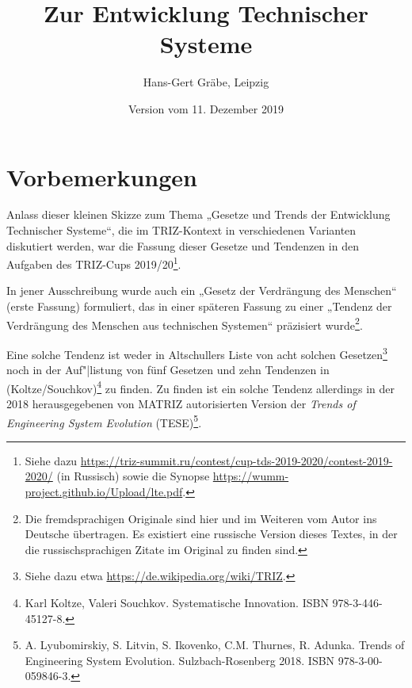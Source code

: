 \documentclass[11pt,a4paper]{article}
\title{Zur Entwicklung Technischer Systeme}
\author{Hans-Gert Gräbe, Leipzig}
\date{Version vom 11. Dezember 2019}
\begin{document}
\maketitle

\section{Vorbemerkungen}

Anlass dieser kleinen Skizze zum Thema „Gesetze und Trends der Entwicklung
Technischer Systeme“, die im TRIZ-Kontext in verschiedenen Varianten
diskutiert werden, war die Fassung dieser Gesetze und Tendenzen in den
Aufgaben des TRIZ-Cups 2019/20\footnote{Siehe dazu
  \url{https://triz-summit.ru/contest/cup-tds-2019-2020/contest-2019-2020/}
  (in Russisch) sowie die Synopse
  \url{https://wumm-project.github.io/Upload/lte.pdf}. }.

In jener Ausschreibung wurde auch ein „Gesetz der Verdrängung des Menschen“
(erste Fassung) formuliert, das in einer späteren Fassung zu einer „Tendenz
der Verdrängung des Menschen aus technischen Systemen“ präzisiert
wurde\footnote{Die fremdsprachigen Originale sind hier und im Weiteren vom
  Autor ins Deutsche übertragen. Es existiert eine russische Version dieses
  Textes, in der die russischsprachigen Zitate im Original zu finden sind.}.

Eine solche Tendenz ist weder in Altschullers Liste von acht solchen
Gesetzen\footnote{Siehe dazu etwa \url{https://de.wikipedia.org/wiki/TRIZ}.}
noch in der Auf"|listung von fünf Gesetzen und zehn Tendenzen in
(Koltze/Souchkov)\footnote{Karl Koltze, Valeri Souchkov. Systematische
  Innovation. ISBN 978-3-446-45127-8.} zu finden.  Zu finden ist ein solche
Tendenz allerdings in der 2018 herausgegebenen von MATRIZ autorisierten
Version der \emph{Trends of Engineering System Evolution}
(TESE)\footnote{A. Lyubomirskiy, S. Litvin, S. Ikovenko, C.M. Thurnes,
  R. Adunka. Trends of Engineering System Evolution. Sulzbach-Rosenberg 2018.
  ISBN 978-3-00-059846-3.}.
\end{document}
